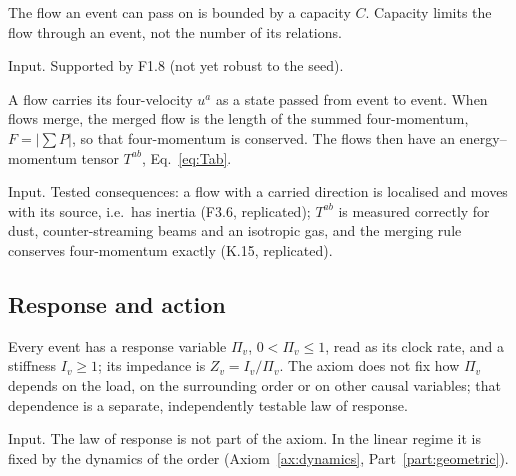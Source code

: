 \begin{axiom}\label{ax:capacity}
The flow an event can pass on is bounded by a capacity $C$. Capacity limits the flow through an
event, not the number of its relations.
\end{axiom}
\begin{status} Input. Supported by F1.8 (not yet robust to the seed). \end{status}

\begin{axiom}\label{ax:momentum}
A flow carries its four-velocity $u^a$ as a state passed from event to event. When flows merge, the
merged flow is the length of the summed four-momentum, $F=|\sum P|$, so that four-momentum is
conserved. The flows then have an energy--momentum tensor $T^{ab}$, Eq.~\eqref{eq:Tab}.
\end{axiom}
\begin{status} Input. Tested consequences: a flow with a carried direction is localised and moves with
its source, i.e.\ has inertia (F3.6, replicated); $T^{ab}$ is measured correctly for dust,
counter-streaming beams and an isotropic gas, and the merging rule conserves four-momentum exactly
(K.15, replicated). \end{status}

\subsection{Response and action}

\begin{axiom}\label{ax:response}
Every event has a response variable $\Pi_v$, $0<\Pi_v\le1$, read as its clock rate, and a stiffness
$I_v\ge1$; its impedance is $Z_v=I_v/\Pi_v$. The axiom does not fix how $\Pi_v$ depends on the
load, on the surrounding order or on other causal variables; that dependence is a separate,
independently testable law of response.
\end{axiom}
\begin{status} Input. The law of response is not part of the axiom. In the linear regime it is
fixed by the dynamics of the order (Axiom~\ref{ax:dynamics}, Part~\ref{part:geometric}). \end{status}

